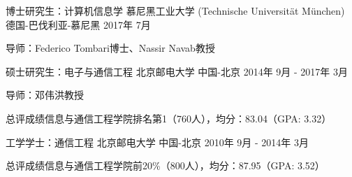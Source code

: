 



\begin{cventries}

\cventry
{博士研究生：计算机信息学} %
{慕尼黑工业大学 (Technische Universität München)} %
{德国-巴伐利亚-慕尼黑} %
{2017年 7月} %
{ %
\begin{cvitems}
\item {导师：Federico Tombari博士、Nassir Navab教授}
\end{cvitems}
}

\cventry
{硕士研究生：电子与通信工程} %
{北京邮电大学} %
{中国-北京} %
{2014年 9月 - 2017年 3月} %
{ %
\begin{cvitems}
\item {导师：邓伟洪教授}
\item {总评成绩信息与通信工程学院排名第1（760人），均分：83.04（GPA: 3.32）}
\end{cvitems}
}


\cventry
{工学学士：通信工程} %
{北京邮电大学} %
{中国-北京} %
{2010年 9月 - 2014年 3月} %
{ %
\begin{cvitems}
\item {总评成绩信息与通信工程学院前20\%（800人），均分：87.95（GPA: 3.52）}
\end{cvitems}
}%

\end{cventries}
